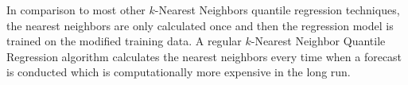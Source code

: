 In comparison to most other \(k\)-Nearest Neighbors quantile 
regression techniques, the nearest neighbors are only calculated once 
and then the regression model is trained on the modified training data. 
A regular \(k\)-Nearest Neighbor Quantile Regression algorithm 
calculates the nearest neighbors every time when a forecast is conducted 
which is computationally more expensive in the long run.